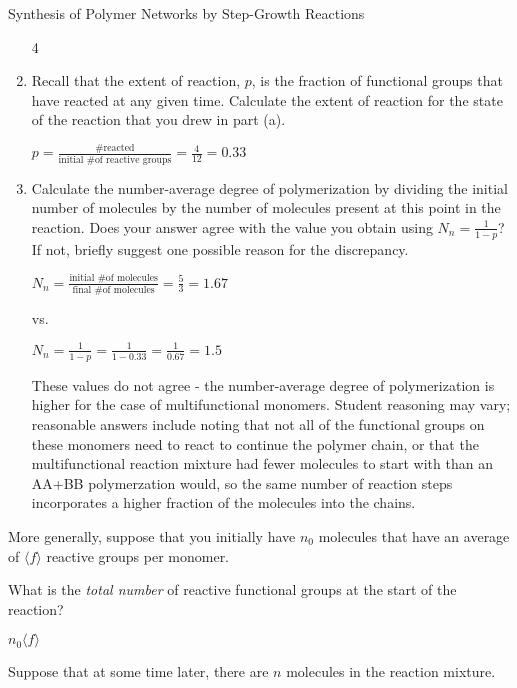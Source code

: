 \begin{activity}[extension]{Synthesis of Polymer Networks by Step-Growth Reactions}
\begin{ctqs}
\begin{enumerate}
				\begin{solution}[0.5in]
					4
				\end{solution}
				
			\item Recall that the extent of reaction, $p$, is the fraction of functional groups that have reacted at any given time.  Calculate the extent of reaction for the state of the reaction that you drew in part (a).
			
				\begin{solution}[1.25in]
					$p = \frac{\text{\# reacted}}{\text{initial \# of reactive groups}} = \frac{4}{12} = 0.33$
				\end{solution}
				
			\item Calculate the number-average degree of polymerization by dividing the initial number of molecules by the number of molecules present at this point in the reaction.  Does your answer agree with the value you obtain using $N_n = \frac{1}{1-p}$?  If not, briefly suggest one possible reason for the discrepancy.
			
				\begin{solution}[2.25in]
					$N_n = \frac{\text{initial \# of molecules}}{\text{final \# of molecules}} = \frac{5}{3} = 1.67$
					
					vs.
					
					$N_n = \frac{1}{1-p} = \frac{1}{1-0.33} = \frac{1}{0.67} = 1.5$
					
					These values do not agree - the number-average degree of polymerization is higher for the case of multifunctional monomers.  Student reasoning may vary; reasonable answers include noting that not all of the functional groups on these monomers need to react to continue the polymer chain, or that the multifunctional reaction mixture had fewer molecules to start with than an AA+BB polymerzation would, so the same number of reaction steps incorporates a higher fraction of the molecules into the chains.
				\end{solution}
		\end{enumerate}

	\question More generally, suppose that you initially have $n_0$ molecules that have an average of $\langle f\rangle$ reactive groups per monomer.  
	
		What is the \emph{total number} of reactive functional groups at the start of the reaction?
			\begin{solution}[1in]
				$n_0 \langle f \rangle$
			\end{solution}
	\question Suppose that at some time later, there are $n$ molecules in the reaction mixture.
	

\end{ctqs}
\end{activity}
